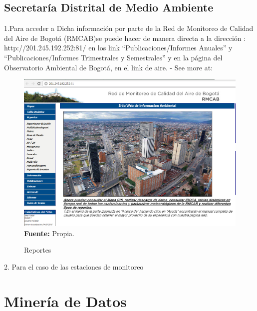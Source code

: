\documentclass[a4paper,openright,12pt]{book}
\theoremstyle{definition}
\theoremstyle{remark}
\begin{document}
\subsection{Secretaría Distrital de Medio Ambiente}
1.Para acceder a Dicha información por parte de la Red de Monitoreo de Calidad del Aire de Bogotá (RMCAB)se puede hacer de manera directa a la dirección : http://201.245.192.252:81/ en los link  “Publicaciones/Informes Anuales” y “Publicaciones/Informes Trimestrales y Semestrales” y en la página del Observatorio Ambiental de Bogotá,  en el link de aire. - See more at: \
\begin{figure}[h]
\centering
\caption{Reportes} 
\includegraphics[scale=0.5]{RMCAB}
\label{fig:RMCAN1}
\\ \textbf{Fuente:} Propia.
\end{figure}
2. Para el caso de las estaciones de monitoreo





\section{Minería de Datos}
\end{document}
